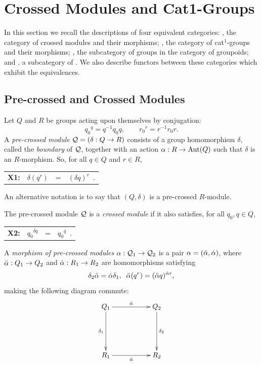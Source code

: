 
\section{Crossed Modules and Cat1-Groups} \label{sect:xmod}

In this section we recall the descriptions of four equivalent categories:
{\catXMod}, the category of crossed modules and their morphisms;
{}, the category of cat$^1$-groups and their morphisms; 
{\catGpGpd}, the subcategory of groups in the category
{\catGpd} of groupoids; and 
{\cattGp}, a subcategory of {\cattCat}.
We also describe functors between these categories which exhibit
the equivalences.


\subsection{Pre-crossed and Crossed Modules}

Let $Q$ and $R$ be groups acting upon themselves by conjugation:
$$
{q_0}^q = q^{-1}q_0q, \qquad {r_0}^r = r^{-1}r_0r.
$$
A \emph{pre-crossed module}   
$\mathcal{Q} = (\delta : Q \to R )$ 
consists of a group homomorphism $\delta $,  
called the \emph{boundary} of $\mathcal{Q}$, 
together with an action 
$\alpha : R \to \mathrm{Aut}(Q)$ such that $\delta$  is an $R$-morphism.
So, for all $q \in Q$  and  $r \in R$,
\begin{center}
\begin{tabular}{c r c l }
\textbf{X1:} &  $\delta(q^r)$   &  =  &  $(\delta q)^r$~.
\end{tabular}
\end{center}
An alternative notation is to say that  $(Q,\delta)$
is a pre-crossed $R$-module.

The pre-crossed module  $\mathcal{Q}$  is a \emph{crossed module} 
if it also satisfies, for all  $q_0,q \in Q$,
\begin{center}
\begin{tabular}{c r c l }
\textbf{X2:} &  ${q_0}^{\delta q}$  &  =  &  ${q_0}^q$~. 
\end{tabular}
\end{center}

A \emph{morphism of pre-crossed modules}  
$\alpha : \mathcal{Q}_1 \to \mathcal{Q}_2$ 
is a pair  $\alpha = (\ddot{\alpha}, \dot{\alpha})$, where 
$\ddot{\alpha} : Q_1 \to Q_2$ and $\dot{\alpha} : R_1 \to R_2$ are homomorphisms satisfying
$$
\delta_2 \ddot{\alpha} = \dot{\alpha} \delta_1, \; \;
\ddot{\alpha}(q^r) = (\ddot{\alpha}  q)^{\dot{\alpha} r},
$$
making the following diagram commute:
\begin{equation} \label{eq:prexmod-morph} 
\vcenter{\xymatrix{ 
  Q_1 \ar[rr]^{\dda} \ar[dd]_{\delta_1}
     && Q_2 \ar[dd]^{\delta_2} \\
     &&  \\
  R_1 \ar[rr]_{\da}
     && R_2
}}
\end{equation} 


